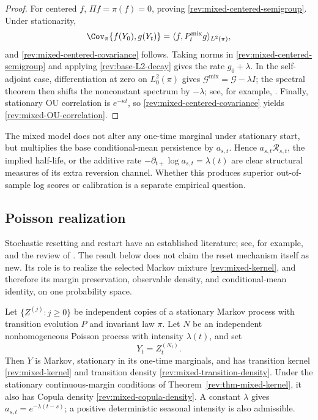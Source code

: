 \begin{proof}
For centered $f$, $\Pi f=\pi(f)=0$, proving
\eqref{rev:mixed-centered-semigroup}.  Under stationarity,
\[
 \Cov_\pi\{f(Y_0),g(Y_t)\}
 =\langle f,P_t^{\mathrm{mix}}g\rangle_{L^2(\pi)},
\]
and \eqref{rev:mixed-centered-covariance} follows.  Taking norms in
\eqref{rev:mixed-centered-semigroup} and applying
\eqref{rev:base-L2-decay} gives the rate $g_0+\lambda$.  In the self-adjoint
case, differentiation at zero on $L_0^2(\pi)$ gives
$\mathcal G^{\mathrm{mix}}=\mathcal G-\lambda I$; the spectral theorem then
shifts the nonconstant spectrum by $-\lambda$; see, for example,
\citet[Chapter~1]{Davies1989}.  Finally, stationary OU
correlation is $e^{-\kappa t}$, so
\eqref{rev:mixed-centered-covariance} yields
\eqref{rev:mixed-OU-correlation}.
\end{proof}

\begin{remark}
The mixed model does not alter any one-time marginal under stationary start,
but multiplies the base conditional-mean persistence by $a_{s,t}$.  Hence
$a_{s,t}\mathcal R_{s,t}$, the implied half-life, or the additive rate
$-\partial_{t+}\log a_{s,t}=\lambda(t)$ are clear structural measures of its
extra reversion channel.  Whether this produces superior out-of-sample log
scores or calibration is a separate empirical question.
\end{remark}

\subsection{Poisson realization}

Stochastic resetting and restart have an established literature; see, for
example, \citet{EvansMajumdar2011} and the review of
\citet{EvansMajumdarSchehr2020}.  The result below does not claim the reset
mechanism itself as new.  Its role is to realize the selected Markov mixture
\eqref{rev:mixed-kernel}, and therefore its margin preservation, observable
density, and conditional-mean identity, on one probability space.

\begin{theorem}
\label{rev:thm-poisson-construction}
Let $\{Z^{(j)}:j\ge0\}$ be independent copies of a stationary Markov process
with transition evolution $P$ and invariant law $\pi$.  Let $N$ be an
independent nonhomogeneous Poisson process with intensity $\lambda(t)$, and set
\begin{equation}
Y_t=Z_t^{(N_t)}.
\label{rev:poisson-copy-process}
\end{equation}
Then $Y$ is Markov, stationary in its one-time marginals, and has transition
kernel \eqref{rev:mixed-kernel} and transition density
\eqref{rev:mixed-transition-density}.  Under the stationary continuous-margin
conditions of Theorem~\ref{rev:thm-mixed-kernel}, it also has Copula density
\eqref{rev:mixed-copula-density}.  A constant $\lambda$ gives
$a_{s,t}=e^{-\lambda(t-s)}$; a positive deterministic seasonal intensity is
also admissible.
\end{theorem}

